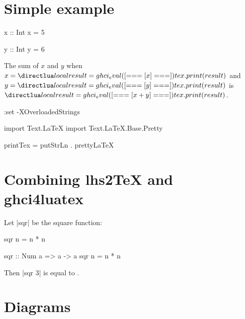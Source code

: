 \documentclass{article}
\begin{document}
\section{Simple example}

\begin{ghci}
x :: Int
x = 5


y :: Int
y = 6
\end{ghci}

The sum of $x$ and $y$ when $x = \hask{x}$ and $y = \hask{y}$ is $\hask{x + y}$.




\begin{ghci}
:set -XOverloadedStrings
\end{ghci}

\begin{ghci}
import Text.LaTeX
import Text.LaTeX.Base.Pretty

printTex = putStrLn . prettyLaTeX
\end{ghci}




\section{Combining lhs2TeX and ghci4luatex}


Let |sqr| be the square function:

\begin{code}
sqr n = n * n
\end{code}

\begin{ghci}
  sqr :: Num a => a -> a
  sqr n = n * n
\end{ghci}

Then  |sqr 3| is equal to .


\section{Diagrams}
\end{document}
